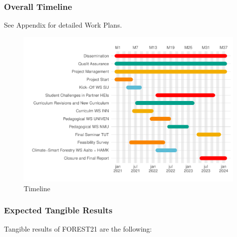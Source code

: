 \documentclass[
  11pt,
]{article}
\begin{document}
\hypertarget{overall-timeline}{%
\subsubsection{Overall Timeline}\label{overall-timeline}}

See Appendix for detailed Work Plans.

\begin{figure}
\centering
\includegraphics{QP2_Front_Page_files/figure-latex/timeline-1.pdf}
\caption{Timeline}
\end{figure}

\clearpage

\hypertarget{expected-tangible-results}{%
\subsubsection{Expected Tangible
Results}\label{expected-tangible-results}}

Tangible results of FOREST21 are the following:
\end{document}
